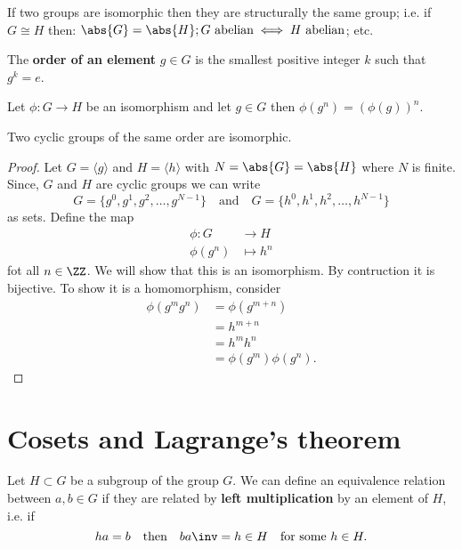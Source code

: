 \documentclass[12pt, a4paper]{article}
\begin{document}
\begin{mdremark}
    If two groups are isomorphic then they are structurally the same group; i.e. if \(G \cong H\) then: \(\abs{G}=\abs{H}; G \text{ abelian} \iff H \text{ abelian}\); etc.
\end{mdremark}

\begin{theorem}
    The \textbf{order of an element} \(g \in G\) is the smallest positive integer \(k\) such that \(g^k =e\).
\end{theorem}

\begin{corollary}
    Let \(\phi : G \to H\) be an isomorphism and let \(g \in G\) then \(\phi(g^n)=\left( \phi(g) \right)^n\).
\end{corollary}

\begin{mdthm}
    Two cyclic groups of the same order are isomorphic.
\end{mdthm}

\begin{proof}
    Let \(G = \langle g \rangle\) and \(H = \langle h \rangle\) with \(N = \abs{G}=\abs{H}\) where \(N\) is finite. Since, \(G\) and \(H\) are cyclic groups we can write 
    \[G = \{g^0,g^1,g^2,\ldots, g^{N-1}\} \quad \text{and} \quad G = \{h^0,h^1,h^2,\ldots, h^{N-1}\}\]
    as sets. Define the map 
    \[\begin{aligned}
        \phi : G &\to H \\
        \phi(g^n) &\mapsto h^n
    \end{aligned}\]
    fot all \(n \in \ZZ\). We will show that this is an isomorphism. By contruction it is bijective. To show it is a homomorphism, consider 
    \[\begin{aligned}
        \phi(g^m g^n) &= \phi(g^{m+n}) \\
        &= h^{m+n} \\
        &=h^{m} h^n \\
        &=\phi(g^m)\phi(g^n).
    \end{aligned}\]
\end{proof}

\pagebreak

\section{Cosets and Lagrange's theorem}

Let \(H \subset G\) be a subgroup of the group \(G\). We can define an equivalence relation between \(a,b \in G\) if they are related by \textbf{left multiplication} by an element of \(H\), i.e. if 
\[ha=b \quad \text{then} \quad ba\inv =h \in H \quad \text{for some } h\in H.\]
\end{document}
